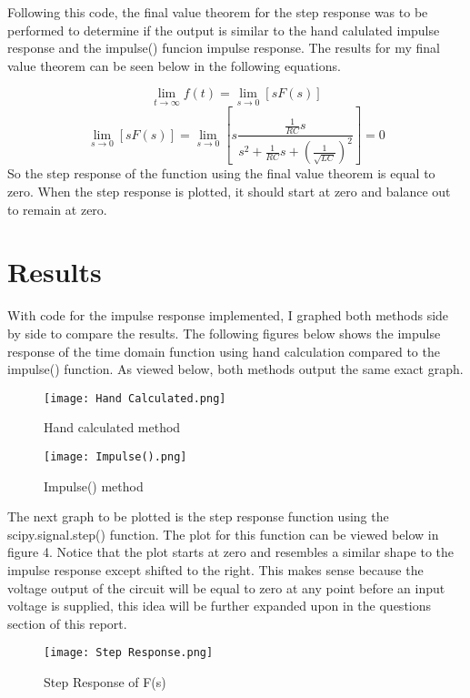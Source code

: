 \documentclass[12pt]{report}
\begin{document}
\hspace{\parindent}Following this code, the final value theorem for the step response was to be performed to determine if the output is similar to the hand calulated impulse response and the impulse() funcion impulse response. The results for my final value theorem can be seen below in the following equations. \par
\[\lim_{t\to\infty}{f(t)} = \lim_{s\to0}[sF(s)]\]
\[\lim_{s\to0}[sF(s)] = \lim_{s\to0}[s\frac{\frac{1}{RC}s}{s^2+\frac{1}{RC}s + (\frac{1}{\sqrt{LC}})^2}] = 0\]
\hspace{\parindent}So the step response of the function using the final value theorem is equal to zero. When the step response is plotted, it should start at zero and balance out to remain at zero. \par

\section{Results}
\hspace{\parindent}With code for the impulse response implemented, I graphed both methods side by side to compare the results. The following figures below shows the impulse response of the time domain function using hand calculation compared to the impulse() function. As viewed below, both methods output the same exact graph. \par
\begin{figure}[h!]
    \centering
    \texttt{[image: Hand Calculated.png]}
    \caption{Hand calculated method}
    \label{Figure x:}
\end{figure}
\begin{figure}[h!]
    \centering
    \texttt{[image: Impulse().png]}
    \caption{Impulse() method}
    \label{Figure x:}
\end{figure}
\hspace{\parindent}The next graph to be plotted is the step response function using the scipy.signal.step() function. The plot for this function can be viewed below in figure 4. Notice that the plot starts at zero and resembles a similar shape to the impulse response except shifted to the right. This makes sense because the voltage output of the circuit will be equal to zero at any point before an input voltage is supplied, this idea will be further expanded upon in the questions section of this report. \par
\begin{figure}[h!]
    \centering
    \texttt{[image: Step Response.png]}
    \caption{Step Response of F(s)}
    \label{Figure x:}
\end{figure}
\end{document}
